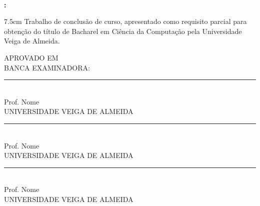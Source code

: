
\begin{center}

    \thispagestyle{pretext}

    \ \\

    \vfill

    \textbf{\uppercase\expandafter{\TitleName}:} \\
    \textbf{\uppercase\expandafter{\SubtitleName}}

    \vfill


    \begin{adjustwidth}{7.5cm}{}
        \noindent Trabalho de conclusão de curso, apresentado como requisito parcial para obtenção do título de Bacharel em Ciência da Computação pela Universidade Veiga de Almeida.
    \end{adjustwidth}

    \vfill

    {

        APROVADO EM\\[2cm]

        BANCA EXAMINADORA: \\[1.5cm]

        \rule{0.7\textwidth}{0.4pt} \\
        Prof. Nome \\
        UNIVERSIDADE VEIGA DE ALMEIDA \\[1.5cm]

        \rule{0.7\textwidth}{0.4pt} \\
        Prof. Nome \\
        UNIVERSIDADE VEIGA DE ALMEIDA \\[1.5cm]

        \rule{0.7\textwidth}{0.4pt} \\
        Prof. Nome \\
        UNIVERSIDADE VEIGA DE ALMEIDA \\
    }


\end{center}


\newpage
